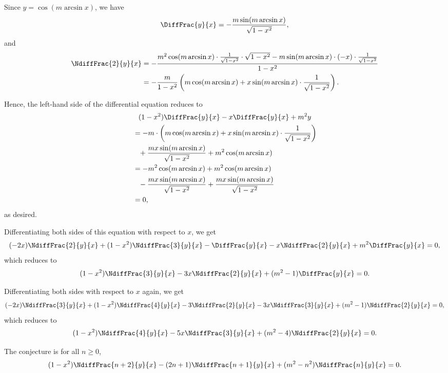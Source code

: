 \Question{\currfilebase}

Since \(y = \cos (m \arcsin x)\), we have
\[
    \DiffFrac{y}{x} = - \frac{m \sin (m \arcsin x)}{\sqrt{1 - x^2}},
\]
and
\begin{align*}
    \NdiffFrac{2}{y}{x} & = - \frac{m^2 \cos (m \arcsin x) \cdot \frac{1}{\sqrt{1 - x^2}} \cdot \sqrt{1 - x^2} - m \sin (m \arcsin x) \cdot (-x) \cdot \frac{1}{\sqrt{1 - x^2}}}{1 - x^2} \\
                        & = -\frac{m}{1 - x^2} \left(m \cos(m \arcsin x) + x \sin (m \arcsin x) \cdot \frac{1}{\sqrt{1 - x^2}}\right).
\end{align*}

Hence, the left-hand side of the differential equation reduces to
\begin{align*}
     & \phantom{=} (1 - x^2) \DiffFrac{y}{x} - x \DiffFrac{y}{x} + m^2 y                                         \\
     & = -m \cdot \left(m \cos(m \arcsin x) + x \sin (m \arcsin x) \cdot \frac{1}{\sqrt{1 - x^2}}\right)         \\
     & \phantom{=} + \frac{mx \sin (m \arcsin x)}{\sqrt{1 - x^2}} + m^2 \cos (m \arcsin x)                       \\
     & = -m^2 \cos (m \arcsin x) + m^2 \cos (m \arcsin x)                                                        \\
     & \phantom{=} - \frac{mx \sin (m \arcsin x)}{\sqrt{1 - x^2}} + \frac{mx \sin (m \arcsin x)}{\sqrt{1 - x^2}} \\
     & = 0,
\end{align*}
as desired.

Differentiating both sides of this equation with respect to \(x\), we get
\[
    (-2x) \NdiffFrac{2}{y}{x} + (1 - x^2) \NdiffFrac{3}{y}{x} - \DiffFrac{y}{x} - x \NdiffFrac{2}{y}{x} + m^2 \DiffFrac{y}{x} = 0,
\]
which reduces to
\[
    (1 - x^2) \NdiffFrac{3}{y}{x} -3x \NdiffFrac{2}{y}{x} + (m^2 - 1) \DiffFrac{y}{x} = 0.
\]

Differentiating both sides with respect to \(x\) again, we get
\[
    (-2x) \NdiffFrac{3}{y}{x} + (1 - x^2) \NdiffFrac{4}{y}{x} - 3 \NdiffFrac{2}{y}{x} - 3x \NdiffFrac{3}{y}{x} + (m^2 - 1) \NdiffFrac{2}{y}{x} = 0,
\]
which reduces to
\[
    (1 - x^2) \NdiffFrac{4}{y}{x} - 5x \NdiffFrac{3}{y}{x} + (m^2 - 4) \NdiffFrac{2}{y}{x} = 0.
\]

The conjecture is for all \(n \geq 0\),
\[
    (1 - x^2) \NdiffFrac{n + 2}{y}{x} - (2n + 1) \NdiffFrac{n + 1}{y}{x} + (m^2 - n^2) \NdiffFrac{n}{y}{x} = 0.
\]

